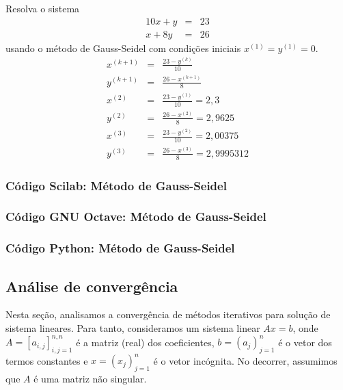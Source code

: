\begin{ex}
Resolva o sistema
\begin{eqnarray}
  10x+y&=&23\\
  x+8y&=&26
\end{eqnarray}
usando o método de Gauss-Seidel com condições iniciais $x^{(1)}=y^{(1)}=0$.
\begin{eqnarray}
x^{(k+1)}&=&\frac{23-y^{(k)}}{10}\\
y^{(k+1)}&=&\frac{26-x^{(k+1)}}{8}\\
x^{(2)}&=&\frac{23-y^{(1)}}{10}=2,3\\
y^{(2)}&=&\frac{26-x^{(2)}}{8}=2,9625\\
x^{(3)}&=&\frac{23-y^{(2)}}{10}=2,00375  \\
y^{(3)}&=&\frac{26-x^{(3)}}{8}=2,9995312
\end{eqnarray}
\end{ex}

\ifisscilab
\subsubsection{Código Scilab: Método de Gauss-Seidel}


\fi
\ifisoctave
\subsubsection{Código GNU Octave: Método de Gauss-Seidel}


\fi
\ifispython
\subsubsection{Código Python: Método de Gauss-Seidel}


\fi

\subsection{Análise de convergência}

Nesta seção, analisamos a convergência de métodos iterativos para solução de sistema lineares. Para tanto, consideramos um sistema linear $Ax = b$, onde $A = [a_{i,j}]_{i,j=1}^{n,n}$ é a matriz (real) dos coeficientes, $b = (a_j)_{j=1}^n$ é o vetor dos termos constantes e $x = (x_j)_{j=1}^n$ é o vetor incógnita. No decorrer, assumimos que $A$ é uma matriz não singular.

